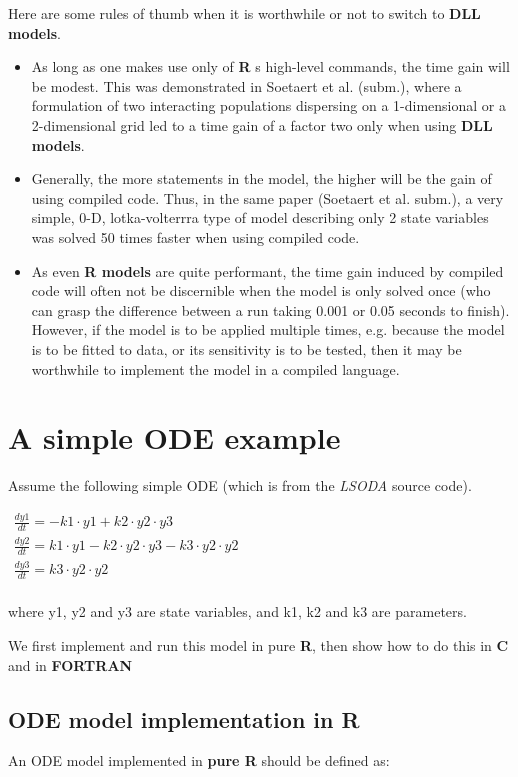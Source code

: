 \documentclass[english]{article}
\newcommand{\R}{\textbf{\textsf{R}}\xspace}
\newcommand{\FOR}{\textbf{\textsf{FORTRAN}}\xspace}
\newcommand{\C}{\textbf{\textsf{C}}\xspace}
\newcommand{\Rmodels}{\textbf{\textsf{R models}}\xspace}
\newcommand{\DLLmodels}{\textbf{\textsf{DLL models}}\xspace}
\begin{document}
Here are some rules of thumb when it is worthwhile or not to switch to
\DLLmodels.
\begin{itemize}
\item As long as one makes use only of \R s high-level commands,
the time gain will be modest. This was demonstrated in Soetaert et
al. (subm.), where a formulation of two interacting populations
dispersing on a 1-dimensional or a 2-dimensional grid led to a
time gain of a factor two only when using \DLLmodels. \item
Generally, the more statements in the model, the higher will be
the gain of using compiled code. Thus, in the same paper (Soetaert
et al. subm.), a very simple, 0-D, lotka-volterrra type of model
describing only 2 state variables was solved 50 times faster when
using compiled code. \item As even \Rmodels are quite performant,
the time gain induced by compiled code will often not be
discernible when the model is only solved once (who can grasp the
difference between a run taking 0.001 or 0.05 seconds to finish).
However, if the model is to be applied multiple times, e.g.
because the model is to be fitted to data, or its sensitivity is
to be tested, then it may be worthwhile to implement the model in
a compiled language.
\end{itemize}

\section{A simple ODE example}

Assume the following simple ODE (which is from the \emph{LSODA} source code).

$\begin{array}{l}
 \frac{{dy1}}{{dt}} =  - k1 \cdot y1 + k2 \cdot y2 \cdot y3 \\
 \frac{{dy2}}{{dt}} = k1 \cdot y1 - k2 \cdot y2 \cdot y3 - k3 \cdot y2 \cdot y2 \\
 \frac{{dy3}}{{dt}} = k3 \cdot y2 \cdot y2 \\
 \end{array}$

 where y1, y2 and y3 are state variables, and k1, k2 and k3 are parameters.

 We first implement and run this model in pure \R, then show how to do
 this in \C and in \FOR
\subsection{ODE model implementation in \R}
An ODE model implemented in \textbf{pure \R} should be defined as:
\end{document}
